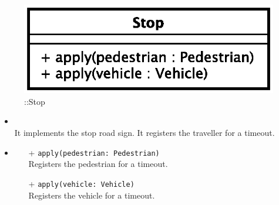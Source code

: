 \begin{figure}[h]
\centering
\includegraphics[scale=0.6,keepaspectratio]{images/solution/app/backend/stop.eps}
\caption{\pPassive::Stop}
\label{fig:sd-app-stop}
\end{figure}
\FloatBarrier
\begin{itemize}
  \item \textbf{\descr} \\
It implements the stop road sign. It registers the traveller for a timeout.
  \item \textbf{\ops}
  \begin{itemize} 
  \item[+] \texttt{apply(pedestrian: Pedestrian)} \\
Registers the pedestrian for a timeout.
  \item[+] \texttt{apply(vehicle: Vehicle)} \\
Registers the vehicle for a timeout.
  \end{itemize}
\end{itemize}
